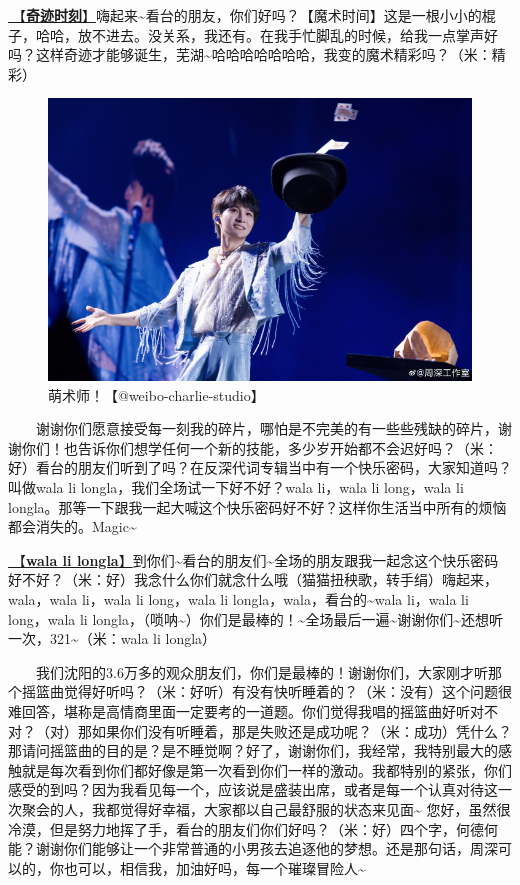 \documentclass[]{ctexbook}
\begin{document}
\hyperref[magic-moment]{🎵【\textbf{奇迹时刻}】}嗨起来\textasciitilde 看台的朋友，你们好吗？【魔术时间】这是一根小小的棍子，哈哈，放不进去。没关系，我还有。在我手忙脚乱的时候，给我一点掌声好吗？这样奇迹才能够诞生，芜湖\textasciitilde 哈哈哈哈哈哈哈，我变的魔术精彩吗？（米：精彩）

\begin{figure}

{\centering \includegraphics[width=400pt]{img/shenyang20240907/001} 

}

\caption{萌术师！【@weibo-charlie-studio】}\label{fig:unnamed-chunk-86}
\end{figure}

  谢谢你们愿意接受每一刻我的碎片，哪怕是不完美的有一些些残缺的碎片，谢谢你们！也告诉你们想学任何一个新的技能，多少岁开始都不会迟好吗？（米：好）看台的朋友们听到了吗？在反深代词专辑当中有一个快乐密码，大家知道吗？叫做wala li longla，我们全场试一下好不好？wala li，wala li long，wala li longla。那等一下跟我一起大喊这个快乐密码好不好？这样你生活当中所有的烦恼都会消失的。Magic\textasciitilde{}

\hyperref[wala-li-longla]{🎵【\textbf{wala li longla}】}到你们\textasciitilde 看台的朋友们\textasciitilde 全场的朋友跟我一起念这个快乐密码好不好？（米：好）我念什么你们就念什么哦（猫猫扭秧歌，转手绢）嗨起来，wala，wala li，wala li long，wala li longla，wala，看台的\textasciitilde wala li，wala li long，wala li longla，（唢呐\textasciitilde）你们是最棒的！\textasciitilde 全场最后一遍\textasciitilde 谢谢你们\textasciitilde 还想听一次，321\textasciitilde（米：wala li longla）

  我们沈阳的3.6万多的观众朋友们，你们是最棒的！谢谢你们，大家刚才听那个摇篮曲觉得好听吗？（米：好听）有没有快听睡着的？（米：没有）这个问题很难回答，堪称是高情商里面一定要考的一道题。你们觉得我唱的摇篮曲好听对不对？（对）那如果你们没有听睡着，那是失败还是成功呢？（米：成功）凭什么？那请问摇篮曲的目的是？是不睡觉啊？好了，谢谢你们，我经常，我特别最大的感触就是每次看到你们都好像是第一次看到你们一样的激动。我都特别的紧张，你们感受的到吗？因为我看见每一个，应该说是盛装出席，或者是每一个认真对待这一次聚会的人，我都觉得好幸福，大家都以自己最舒服的状态来见面\textasciitilde{}
您好，虽然很冷漠，但是努力地挥了手，看台的朋友们你们好吗？（米：好）四个字，何德何能？谢谢你们能够让一个非常普通的小男孩去追逐他的梦想。还是那句话，周深可以的，你也可以，相信我，加油好吗，每一个璀璨冒险人\textasciitilde{}
\end{document}
